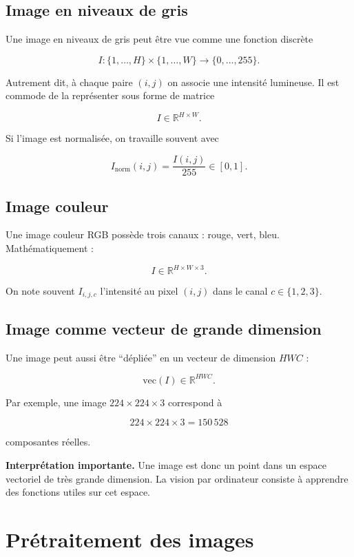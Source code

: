 \documentclass[11pt,a4paper]{article}
\begin{document}
\subsection{Image en niveaux de gris}

Une image en niveaux de gris peut être vue comme une fonction discrète

\[
I : \{1,\dots,H\} \times \{1,\dots,W\} \to \{0,\dots,255\}.
\]

Autrement dit, à chaque paire $(i,j)$ on associe une intensité lumineuse. Il est commode de la représenter sous forme de matrice

\[
I \in \mathbb{R}^{H \times W}.
\]

Si l'image est normalisée, on travaille souvent avec

\[
I_{\mathrm{norm}}(i,j) = \frac{I(i,j)}{255} \in [0,1].
\]

\subsection{Image couleur}

Une image couleur RGB possède trois canaux : rouge, vert, bleu. Mathématiquement :

\[
I \in \mathbb{R}^{H \times W \times 3}.
\]

On note souvent $I_{i,j,c}$ l'intensité au pixel $(i,j)$ dans le canal $c \in \{1,2,3\}$.

\subsection{Image comme vecteur de grande dimension}

Une image peut aussi être \enquote{dépliée} en un vecteur de dimension $HWC$ :

\[
\mathrm{vec}(I) \in \mathbb{R}^{HWC}.
\]

Par exemple, une image $224 \times 224 \times 3$ correspond à

\[
224 \times 224 \times 3 = 150\,528
\]

composantes réelles.

\textbf{Interprétation importante.} Une image est donc un point dans un espace vectoriel de très grande dimension. La vision par ordinateur consiste à apprendre des fonctions utiles sur cet espace.

\section{Prétraitement des images}
\end{document}
